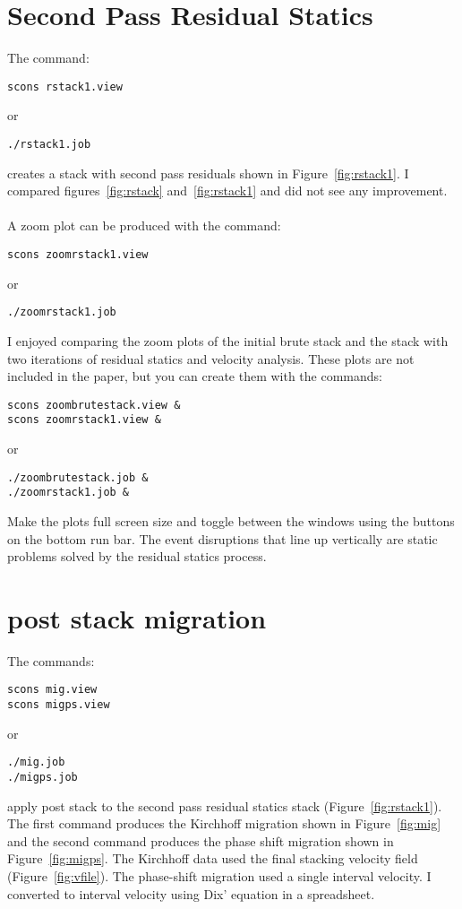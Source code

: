 
\section{Second Pass Residual Statics}
The command:
\begin{verbatim}
scons rstack1.view
\end{verbatim}
or
\begin{verbatim}
./rstack1.job
\end{verbatim}
creates a stack with second pass residuals shown in Figure~\ref{fig:rstack1}.  
I compared figures~\ref{fig:rstack} and~\ref{fig:rstack1} and did not see 
any improvement.\\
\\  
A zoom plot can be produced with the command:
\begin{verbatim}
scons zoomrstack1.view
\end{verbatim}
or
\begin{verbatim}
./zoomrstack1.job
\end{verbatim}

I enjoyed comparing the zoom plots of the initial brute stack and the stack 
with two iterations of residual statics and velocity analysis.  These plots
are not included in the paper, but you can create them with the
commands:
\begin{verbatim}
scons zoombrutestack.view & 
scons zoomrstack1.view & 
\end{verbatim}
or
\begin{verbatim}
./zoombrutestack.job & 
./zoomrstack1.job & 
\end{verbatim}
Make the plots full screen size and toggle between the windows using the 
buttons on the bottom run bar.  The event disruptions that line up vertically
are static problems solved by the residual statics process.
  

\section{post stack migration}
The commands:
\begin{verbatim}
scons mig.view
scons migps.view
\end{verbatim}
or
\begin{verbatim}
./mig.job
./migps.job
\end{verbatim}
apply post stack to the second pass residual statics stack
(Figure~\ref{fig:rstack1}). The first command produces the Kirchhoff
migration shown in Figure~\ref{fig:mig} and the second command
produces the phase shift migration shown in Figure~\ref{fig:migps}.
The Kirchhoff data used the final stacking velocity field
(Figure~\ref{fig:vfile}).  The phase-shift migration used a single
interval velocity.  I converted to interval velocity using Dix'
equation \cite[]{GEO20-01-00680086} in a spreadsheet.

